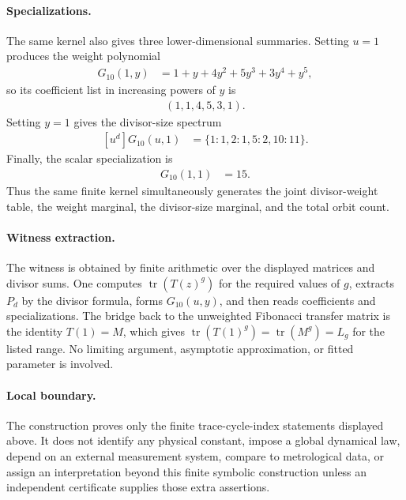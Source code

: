 \paragraph{Specializations.}
The same kernel also gives three lower-dimensional summaries. Setting $u=1$ produces the weight polynomial
$$
\begin{aligned}
G_{10}(1,y)&=1+y+4y^2+5y^3+3y^4+y^5,
\end{aligned}
$$
so its coefficient list in increasing powers of $y$ is
$$
\begin{aligned}
(1,1,4,5,3,1).
\end{aligned}
$$
Setting $y=1$ gives the divisor-size spectrum
$$
\begin{aligned}
[u^d]G_{10}(u,1)&=\{1:1,2:1,5:2,10:11\}.
\end{aligned}
$$
Finally, the scalar specialization is
$$
\begin{aligned}
G_{10}(1,1)&=15.
\end{aligned}
$$
Thus the same finite kernel simultaneously generates the joint divisor-weight table, the weight marginal, the divisor-size marginal, and the total orbit count.

\paragraph{Witness extraction.}
The witness is obtained by finite arithmetic over the displayed matrices and divisor sums. One computes $\operatorname{tr}(T(z)^g)$ for the required values of $g$, extracts $P_d$ by the divisor formula, forms $G_{10}(u,y)$, and then reads coefficients and specializations. The bridge back to the unweighted Fibonacci transfer matrix is the identity $T(1)=M$, which gives $\operatorname{tr}(T(1)^g)=\operatorname{tr}(M^g)=L_g$ for the listed range. No limiting argument, asymptotic approximation, or fitted parameter is involved.

\paragraph{Local boundary.}
The construction proves only the finite trace-cycle-index statements displayed above. It does not identify any physical constant, impose a global dynamical law, depend on an external measurement system, compare to metrological data, or assign an interpretation beyond this finite symbolic construction unless an independent certificate supplies those extra assertions.
